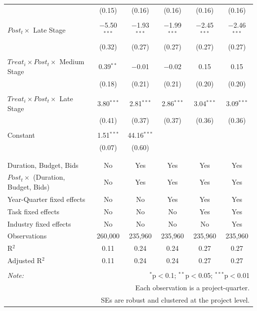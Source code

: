 \documentclass[
]{article}
\begin{document}
\begin{table}[H]
\begin{tabular}{@{\extracolsep{-2pt}}lccccc}
  & (0.15) & (0.16) & (0.16) & (0.16) & (0.16) \\ 
  & & & & & \\ 
 $Post_t \times$ Late Stage & $-$5.50$^{***}$ & $-$1.93$^{***}$ & $-$1.99$^{***}$ & $-$2.45$^{***}$ & $-$2.46$^{***}$ \\ 
  & (0.32) & (0.27) & (0.27) & (0.27) & (0.27) \\ 
  & & & & & \\ 
 $Treat_i \times Post_t \times$ Medium Stage & 0.39$^{**}$ & $-$0.01 & $-$0.02 & 0.15 & 0.15 \\ 
  & (0.18) & (0.21) & (0.21) & (0.20) & (0.20) \\ 
  & & & & & \\ 
 $Treat_i \times Post_t \times$ Late Stage & 3.80$^{***}$ & 2.81$^{***}$ & 2.86$^{***}$ & 3.04$^{***}$ & 3.09$^{***}$ \\ 
  & (0.41) & (0.37) & (0.37) & (0.36) & (0.36) \\ 
  & & & & & \\ 
 Constant & 1.51$^{***}$ & 44.16$^{***}$ &  &  &  \\ 
  & (0.07) & (0.60) &  &  &  \\ 
  & & & & & \\ 
\hline \\[-1.8ex] 
Duration, Budget, Bids & No & Yes & Yes & Yes & Yes \\ 
$Post_t \times $  (Duration, Budget, Bids) & No & Yes & Yes & Yes & Yes \\ 
Year-Quarter fixed effects & No & No & Yes & Yes & Yes \\ 
Task fixed effects & No & No & No & Yes & Yes \\ 
Industry fixed effects & No & No & No & No & Yes \\ 
Observations & 260,000 & 235,960 & 235,960 & 235,960 & 235,960 \\ 
R$^{2}$ & 0.11 & 0.24 & 0.24 & 0.27 & 0.27 \\ 
Adjusted R$^{2}$ & 0.11 & 0.24 & 0.24 & 0.27 & 0.27 \\ 
\hline 
\hline \\[-1.8ex] 
\textit{Note:}  & \multicolumn{5}{r}{$^{*}$p$<$0.1; $^{**}$p$<$0.05; $^{***}$p$<$0.01} \\ 
 & \multicolumn{5}{r}{Each observation is a project-quarter.} \\ 
 & \multicolumn{5}{r}{SEs are robust and clustered at the project level.} \\ 
\end{tabular} 
\end{table}
\end{document}
